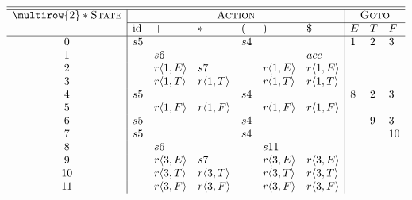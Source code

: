 \centering
\small
$\begin{array}{c|llllll|lll}
\hline\hline
\multirow{2}*{\textsc{State}} & \multicolumn{6}{c|}{\textsc{Action}} & \multicolumn{3}{c}{\textsc{Goto}} \\\cline{2-10}
                             & \text{id} & + & * & ( & ) & \$         & E & T & F \\
\hline

0  & s5 &    &    & s4 &    &  & 1 & 2 & 3\\
1  &    & s6 &    &    &    & acc           \\
2  &    & r \langle 1, E \rangle& s7 &    & r \langle 1, E \rangle& r \langle 1, E \rangle \\
3  &    & r \langle 1, T \rangle & r \langle 1, T \rangle &    & r \langle 1, T \rangle & r \langle 1, T \rangle \\
4  & s5 &    &    & s4 &    & & 8 & 2 & 3 \\
5  &    & r \langle 1, F \rangle & r \langle 1, F \rangle &    & r \langle 1, F \rangle & r \langle 1, F \rangle \\
6  & s5 &    &    & s4 &    & & & 9 & 3 \\
7  & s5 &    &    & s4 &    &  & & & 10\\
8  &    & s6 &    &    & s11&  \\
9  &    & r \langle 3, E \rangle & s7 &    & r \langle 3, E \rangle & r \langle 3, E \rangle \\
10 &    & r \langle 3, T \rangle & r \langle 3, T \rangle &    & r \langle 3, T \rangle & r \langle 3, T \rangle  \\
11 &    & r \langle 3, F \rangle & r \langle 3, F \rangle &    & r \langle 3, F \rangle & r \langle 3, F \rangle
\end{array}$